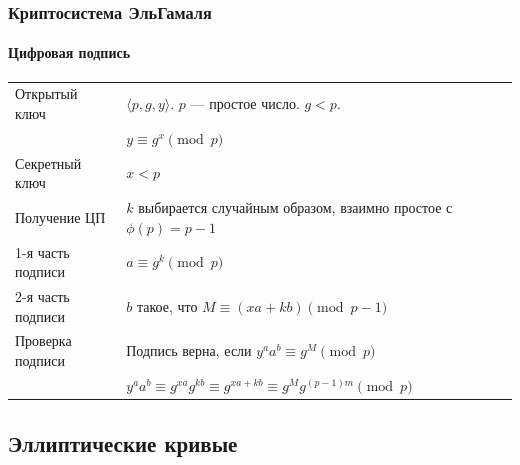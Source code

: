 \begin{frame}
    \frametitle{Криптосистема ЭльГамаля}
    \framesubtitle{Цифровая подпись}

    \begin{table}[ht]
        \centering
        \begin{tabular}[c]{p{}|p{}}
            \hline\hline
            Открытый ключ       & $\langle p,g,y\rangle$. $p$ --- простое число. $g<p$.\\
                                & $y\equiv g^x\pmod{p}$ \\ \hline
            Секретный ключ      & $x<p$\\ \hline
            Получение ЦП        & $k$ выбирается случайным образом, взаимно простое с $\phi(p)=p-1$\\ 
            1-я часть подписи   & $a\equiv g^k\pmod{p}$\\
            2-я часть подписи   & $b$ такое, что $M\equiv(xa+kb)\pmod{p-1}$\\ \hline
            Проверка подписи    & Подпись верна, если $y^{a}a^{b}\equiv g^M\pmod{p}$\\
                                & $y^{a}a^{b} \equiv g^{xa}g^{kb} \equiv g^{xa+kb} \equiv g^{M}g^{(p-1)m} \pmod{p}$\\
            \hline\hline
        \end{tabular}
    \end{table}
\end{frame}


\subsection{Эллиптические кривые}


